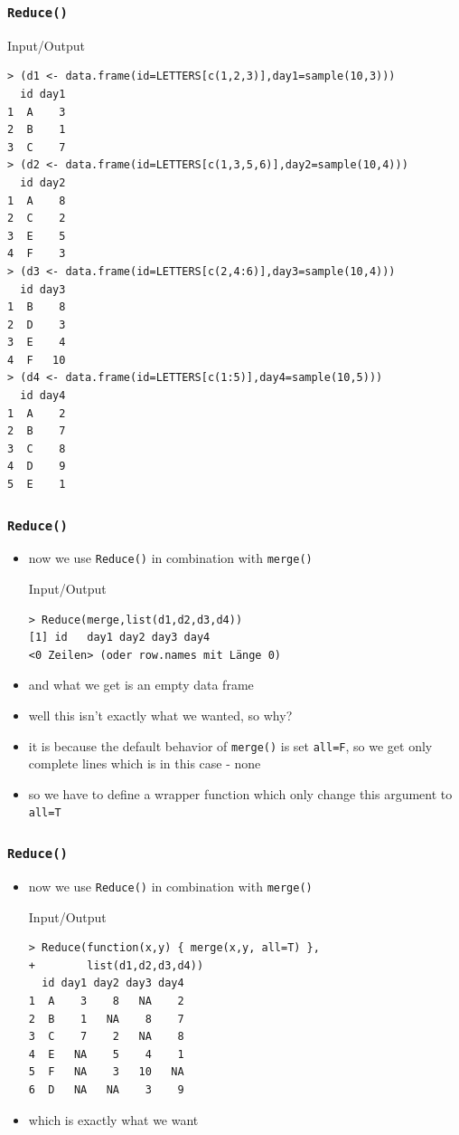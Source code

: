 \documentclass[xcolor={table},c]{beamer}
\begin{document}
\begin{frame}[fragile]\frametitle{\texttt{Reduce()}}
  \begin{exampleblock}{Input/Output}\tiny
\begin{verbatim}
> (d1 <- data.frame(id=LETTERS[c(1,2,3)],day1=sample(10,3)))
  id day1
1  A    3
2  B    1
3  C    7
> (d2 <- data.frame(id=LETTERS[c(1,3,5,6)],day2=sample(10,4)))
  id day2
1  A    8
2  C    2
3  E    5
4  F    3
> (d3 <- data.frame(id=LETTERS[c(2,4:6)],day3=sample(10,4)))
  id day3
1  B    8
2  D    3
3  E    4
4  F   10
> (d4 <- data.frame(id=LETTERS[c(1:5)],day4=sample(10,5)))
  id day4
1  A    2
2  B    7
3  C    8
4  D    9
5  E    1
\end{verbatim}
  \end{exampleblock}
\end{frame}

\begin{frame}[fragile]\frametitle{\texttt{Reduce()}}
  \begin{itemize}
  \item now we use \texttt{Reduce()} in combination with \texttt{merge()}
  \begin{exampleblock}{Input/Output}\tiny
\begin{verbatim}
> Reduce(merge,list(d1,d2,d3,d4))
[1] id   day1 day2 day3 day4
<0 Zeilen> (oder row.names mit Länge 0)
\end{verbatim}
  \end{exampleblock}
\item and what we get is an empty data frame
\item well this isn't exactly what we wanted, so why?
\item it is because the default behavior of \texttt{merge()} is set \texttt{all=F}, so we get only complete lines which is in this case - none
\item so we have to define a wrapper function which only change this argument to \texttt{all=T}
  \end{itemize}

\end{frame}


\begin{frame}[fragile]\frametitle{\texttt{Reduce()}}
  \begin{itemize}
  \item now we use \texttt{Reduce()} in combination with \texttt{merge()}
  \begin{exampleblock}{Input/Output}\small
\begin{verbatim}
> Reduce(function(x,y) { merge(x,y, all=T) },
+        list(d1,d2,d3,d4))
  id day1 day2 day3 day4
1  A    3    8   NA    2
2  B    1   NA    8    7
3  C    7    2   NA    8
4  E   NA    5    4    1
5  F   NA    3   10   NA
6  D   NA   NA    3    9
\end{verbatim}
  \end{exampleblock}
\item which is exactly what we want
  \end{itemize}
\end{frame}
\end{document}
